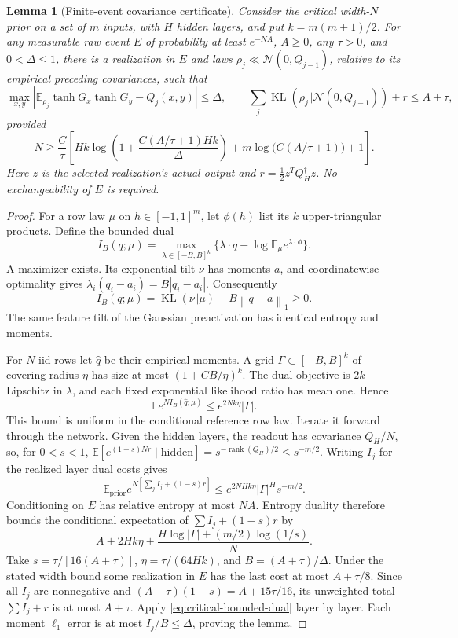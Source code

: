\documentclass[11pt]{article}
\newtheorem{lemma}[theorem]{Lemma}
\theoremstyle{remark}
\newcommand{\E}{\mathbb E}
\newcommand{\KL}{\operatorname{KL}}
\newcommand{\norm}[1]{\left\lVert #1\right\rVert}
\begin{document}
\begin{lemma}[Finite-event covariance certificate]
\label{lem:critical-dual-certificate}
Consider the critical width-$N$ prior on a set of $m$ inputs, with
$H$ hidden layers, and put $k=m(m+1)/2$. For any measurable raw
event $E$ of probability at least $e^{-NA}$, $A\ge0$, any
$\tau>0$, and $0<\Delta\le1$, there is a realization in $E$ and
laws $\rho_j\ll\mathcal N(0,Q_{j-1})$, relative to its empirical
preceding covariances, such that
\[
 \max_{x,y}\left|\E_{\rho_j}\tanh G_x\tanh G_y-Q_j(x,y)\right|
 \le\Delta,\qquad
 \sum_j\KL(\rho_j\Vert\mathcal N(0,Q_{j-1}))+r\le A+\tau,
\]
provided
\[
 N\ge\frac C\tau\left[
 Hk\log\left(1+\frac{C(A/\tau+1)Hk}{\Delta}\right)
 +m\log\bigl(C(A/\tau+1)\bigr)+1\right].
\]
Here $z$ is the selected realization's actual output and
$r=\tfrac12z^TQ_H^\dagger z$. No exchangeability of $E$ is required.
\end{lemma}
\begin{proof}
For a row law $\mu$ on $h\in[-1,1]^m$, let $\phi(h)$ list its $k$
upper-triangular products. Define the bounded dual
\[
 I_B(q;\mu)=\max_{\lambda\in[-B,B]^k}
 \{\lambda\cdot q-\log\E_\mu e^{\lambda\cdot\phi}\}.
\]
A maximizer exists. Its exponential tilt $\nu$ has moments $a$,
and coordinatewise optimality gives
$\lambda_i(q_i-a_i)=B|q_i-a_i|$. Consequently
\begin{equation}
 I_B(q;\mu)=\KL(\nu\Vert\mu)+B\norm{q-a}_1\ge0.
 \label{eq:critical-bounded-dual}
\end{equation}
The same feature tilt of the Gaussian preactivation has identical
entropy and moments.

For $N$ iid rows let $\widehat q$ be their empirical moments. A
grid $\Gamma\subset[-B,B]^k$ of covering radius $\eta$ has size
at most $(1+CB/\eta)^k$. The dual objective is $2k$-Lipschitz in
$\lambda$, and each fixed exponential likelihood ratio has mean
one. Hence
\[
 \E e^{N I_B(\widehat q;\mu)}
 \le e^{2Nk\eta}|\Gamma|.
\]
This bound is uniform in the conditional reference row law.
Iterate it forward through the network. Given the hidden layers,
the readout has covariance $Q_H/N$, so, for $0<s<1$,
$\E[e^{(1-s)Nr}\mid\text{hidden}]
=s^{-\operatorname{rank}(Q_H)/2}\le s^{-m/2}$.
Writing $I_j$ for the realized layer dual costs gives
\[
 \E_{\mathrm{prior}}e^{N[\sum_j I_j+(1-s)r]}
 \le e^{2NHk\eta}|\Gamma|^H s^{-m/2}.
\]
Conditioning on $E$ has relative entropy at most $NA$. Entropy
duality therefore bounds the conditional expectation of
$\sum I_j+(1-s)r$ by
\[
 A+2Hk\eta+
 \frac{H\log|\Gamma|+(m/2)\log(1/s)}N.
\]
Take $s=\tau/[16(A+\tau)]$,
$\eta=\tau/(64Hk)$, and $B=(A+\tau)/\Delta$.
Under the stated width bound some realization in $E$ has the last
cost at most $A+\tau/8$. Since all $I_j$ are nonnegative and
$(A+\tau)(1-s)=A+15\tau/16$, its unweighted total
$\sum I_j+r$ is at most $A+\tau$. Apply
\eqref{eq:critical-bounded-dual} layer by layer. Each moment
$\ell_1$ error is at most $I_j/B\le\Delta$, proving the lemma.
\end{proof}
\end{document}
